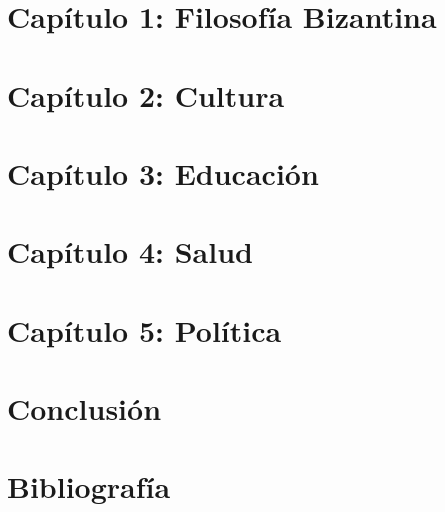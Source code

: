 \documentclass[a4paper,13pt,titlepage,oneside]{article}
\begin{document}
\section{Capítulo 1: Filosofía Bizantina}

\newpage

\section{Capítulo 2: Cultura}

\newpage

\section{Capítulo 3: Educación}

\newpage

\section{Capítulo 4: Salud}

\newpage

\section{Capítulo 5: Política}

\newpage

\section{Conclusión}

\newpage

\section{Bibliografía}
%
\printbibliography
\newpage

\tableofcontents
\end{document}
